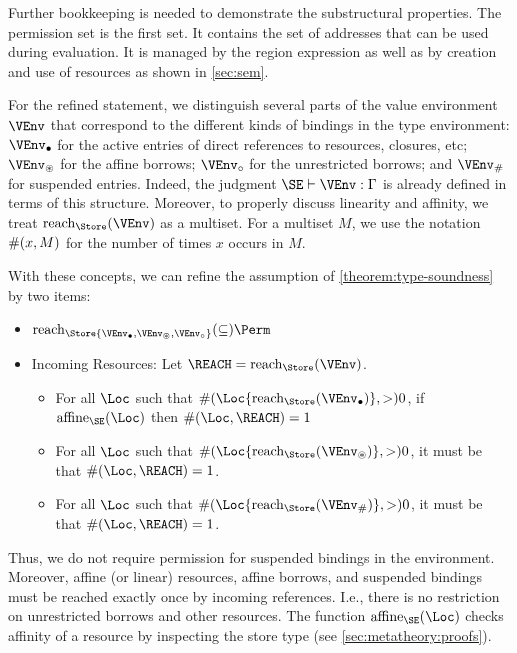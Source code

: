 Further bookkeeping is needed to demonstrate the substructural
properties. The permission set is the first set. It contains the set
of addresses that can be used during evaluation. It is managed by the
region expression as well as by creation and use of resources as
shown in \cref{sec:sem}.

For the refined statement, we distinguish several parts of the value
environment $\VEnv$ that correspond to the different kinds of bindings in the
type environment: $\Active\VEnv$ for the active entries of direct
references to resources, closures, etc; $\MutableBorrows\VEnv$ for the
affine borrows; $\ImmutableBorrows\VEnv$ for the unrestricted borrows;
and $\Suspended\VEnv$ for suspended entries. Indeed, the judgment
$\SE \vdash \VEnv:\E$ is already defined in terms of this structure.
Moreover, to properly discuss linearity and affinity, we treat
$\Reach\Store\VEnv$ as a multiset. For a multiset
$M$, we use the notation $\#(x,M)$ for the number of times $x$ occurs in $M$.


With these concepts, we can refine the assumption of
\cref{theorem:type-soundness} by two items:
\begin{itemize}
\item $\Reach\Store{\Active\VEnv, \MutableBorrows\VEnv, \ImmutableBorrows\VEnv} \subseteq \Perm$
\item Incoming Resources: Let $\REACH = \Reach\Store\VEnv$.
  \begin{itemize}
  \item 
    For all $\Loc$ such that $\MultiNumber\Loc{\Reach{\Store}{\Active\VEnv}} >0$,
    if $\Affine{\SE}\Loc$ then $\MultiNumber\Loc\REACH= 1$
  \item For all $\Loc$ such that $
    \MultiNumber\Loc{\Reach{\Store}{\MutableBorrows\VEnv}} >0$, it
    must be that $\MultiNumber\Loc\REACH=1$.
  \item For all $\Loc$ such that $
    \MultiNumber\Loc{\Reach{\Store}{\Suspended\VEnv}} >0$, it
    must be that $\MultiNumber\Loc\REACH=1$.
  \end{itemize}
\end{itemize}
Thus, we do not require permission for suspended bindings in the
environment. Moreover, affine (or linear)  resources, affine
borrows, and suspended bindings must be reached exactly once by
incoming references. I.e., there is no restriction on unrestricted
borrows and other resources. The function $\Affine{\SE}\Loc$ checks
affinity of a resource by inspecting the store type (see
\cref{sec:metatheory:proofs}). 

